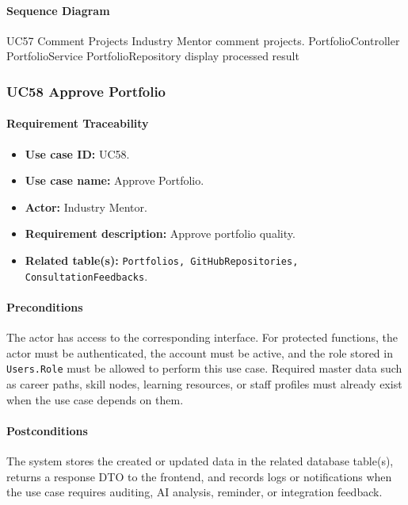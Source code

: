 \paragraph{Sequence Diagram}

\SequenceDiagram
{UC57 Comment Projects}
{Industry Mentor}
{comment projects.}
{PortfolioController}
{PortfolioService}
{PortfolioRepository}
{display processed result}

\subsubsection{UC58 Approve Portfolio}

\paragraph{Requirement Traceability}

\begin{itemize}
    \item \textbf{Use case ID:} UC58.
    \item \textbf{Use case name:} Approve Portfolio.
    \item \textbf{Actor:} Industry Mentor.
    \item \textbf{Requirement description:} Approve portfolio quality.
    \item \textbf{Related table(s):} \texttt{Portfolios, GitHubRepositories, ConsultationFeedbacks}.
\end{itemize}

\paragraph{Preconditions}

The actor has access to the corresponding interface. For protected functions, the actor must be authenticated, the account must be active, and the role stored in \texttt{Users.Role} must be allowed to perform this use case. Required master data such as career paths, skill nodes, learning resources, or staff profiles must already exist when the use case depends on them.

\paragraph{Postconditions}

The system stores the created or updated data in the related database table(s), returns a response DTO to the frontend, and records logs or notifications when the use case requires auditing, AI analysis, reminder, or integration feedback.

